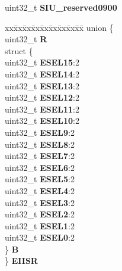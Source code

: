 \begin{DoxyCompactItemize}
\begin{tabbing}
\end{tabbing}\item 
\mbox{\label{structSIU__tag_a1b998dd092692937ba0581541f37e75d}} 
uint32\+\_\+t {\bfseries S\+I\+U\+\_\+reserved0900}
\item 
\mbox{\label{structSIU__tag_a429548429bdf62aaf793e666707acc76}} 
\begin{tabbing}
xx\=xx\=xx\=xx\=xx\=xx\=xx\=xx\=xx\=\kill
union \{\\
\>uint32\_t {\bfseries R}\\
\>struct \{\\
\>\>uint32\_t {\bfseries ESEL15}:2\\
\>\>uint32\_t {\bfseries ESEL14}:2\\
\>\>uint32\_t {\bfseries ESEL13}:2\\
\>\>uint32\_t {\bfseries ESEL12}:2\\
\>\>uint32\_t {\bfseries ESEL11}:2\\
\>\>uint32\_t {\bfseries ESEL10}:2\\
\>\>uint32\_t {\bfseries ESEL9}:2\\
\>\>uint32\_t {\bfseries ESEL8}:2\\
\>\>uint32\_t {\bfseries ESEL7}:2\\
\>\>uint32\_t {\bfseries ESEL6}:2\\
\>\>uint32\_t {\bfseries ESEL5}:2\\
\>\>uint32\_t {\bfseries ESEL4}:2\\
\>\>uint32\_t {\bfseries ESEL3}:2\\
\>\>uint32\_t {\bfseries ESEL2}:2\\
\>\>uint32\_t {\bfseries ESEL1}:2\\
\>\>uint32\_t {\bfseries ESEL0}:2\\
\>\} {\bfseries B}\\
\} {\bfseries EIISR}\\


\end{tabbing}
\end{DoxyCompactItemize}
